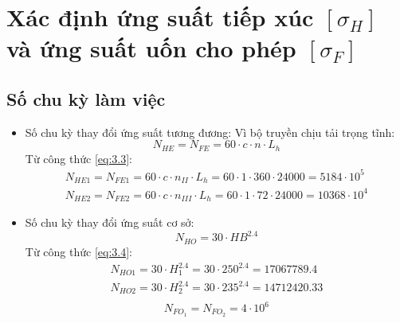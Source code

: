     \section{Xác định ứng suất tiếp xúc  $[\sigma_H]$ và ứng suất uốn cho phép $[\sigma_F]$}
        \subsection{Số chu kỳ làm việc}
            \begin{itemize}
                \item Số chu kỳ thay đổi ứng suất tương đương:
                    Vì bộ truyền chịu tải trọng tĩnh:
                    \begin{equation}
                        N_{HE} = N_{FE} = 60 \cdot c \cdot n \cdot L_h
                        \label{eq:3.3}
                    \end{equation}
                    Từ công thức \ref{eq:3.3}:
                    \begin{align*}
                        N_{HE1} = N_{FE1} = 60 \cdot c \cdot n_{II} \cdot L_h = 60 \cdot 1 \cdot 360 \cdot 24000 = 5184 \cdot 10^5 \\
                        N_{HE2} = N_{FE2} = 60 \cdot c \cdot n_{III} \cdot L_h = 60 \cdot 1 \cdot 72 \cdot 24000 = 10368 \cdot 10^4
                    \end{align*}    
                \item Số chu kỳ thay đổi ứng suất cơ sở:
                    \begin{equation}
                        N_{HO} = 30 \cdot HB^{2.4}
                        \label{eq:3.4}
                    \end{equation}
                    Từ công thức \ref{eq:3.4}:
                    \begin{align*}
                        N_{HO1} = 30 \cdot H_{1}^{2.4} = 30 \cdot 250^{2.4} = 17067789.4 \\
                        N_{HO2} = 30 \cdot H_{2}^{2.4} = 30 \cdot 235^{2.4} = 14712420.33 \\
                    \end{align*}
                    \begin{equation*}
                        N_{FO_1} = N_{FO_2} = 4 \cdot 10^6
                    \end{equation*}
            \end{itemize}

